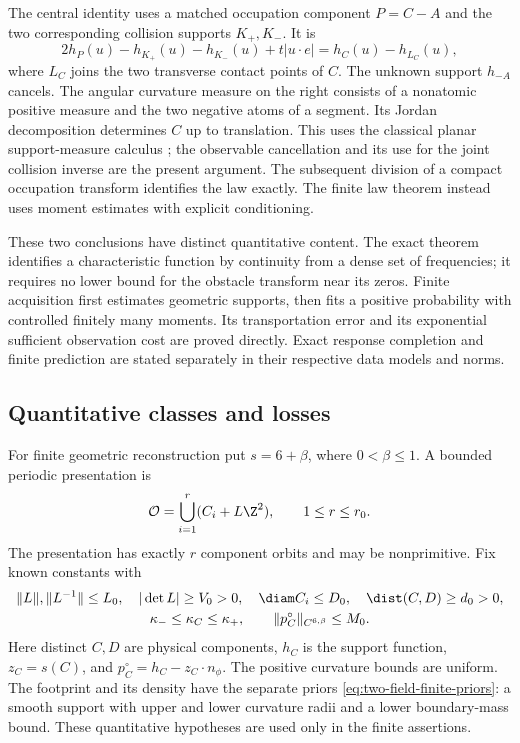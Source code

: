 The central identity uses a matched occupation component $P=C-A$
and the two corresponding collision supports $K_+,K_-$. It is
\[
  2h_P(u)-h_{K_+}(u)-h_{K_-}(u)+t|u\cdot e|=h_C(u)-h_{L_C}(u),
\]
where $L_C$ joins the two transverse contact points of $C$. The
unknown support $h_{-A}$ cancels. The angular curvature measure on
the right consists of a nonatomic positive measure and the two
negative atoms of a segment. Its Jordan decomposition determines
$C$ up to translation. This uses the classical planar support-measure
calculus \cite{Schneider,MartinezMaure}; the observable cancellation
and its use for the joint collision inverse are the present argument.
The subsequent division of a compact occupation transform identifies
the law exactly. The finite law theorem instead uses moment estimates
with explicit conditioning.

These two conclusions have distinct quantitative content. The exact
theorem identifies a characteristic function by continuity from a
dense set of frequencies; it requires no lower bound for the obstacle
transform near its zeros. Finite acquisition first estimates geometric
supports, then fits a positive probability with controlled finitely
many moments. Its transportation error and its exponential sufficient
observation cost are proved directly. Exact response completion and
finite prediction are stated separately in their respective data
models and norms.

\subsection{Quantitative classes and losses}
For finite geometric reconstruction put $s=6+\beta$, where
$0<\beta\le1$. A bounded periodic presentation is
\begin{equation}\label{eq:two-field-presentation}
 \mathcal O=\bigcup_{i=1}^r(C_i+L\Z^2),\qquad 1\le r\le r_0.
\end{equation}
The presentation has exactly $r$ component orbits and may be
nonprimitive. Fix known constants with
\begin{equation}\label{eq:two-field-geometric-priors}
 \begin{gathered}
 \|L\|,\|L^{-1}\|\le L_0,\quad |\det L|\ge V_0>0,\quad
 \diam C_i\le D_0,\quad \dist(C,D)\ge d_0>0,\\
 \kappa_-\le\kappa_C\le\kappa_+,\qquad
                 \|p_C^\circ\|_{C^{6,\beta}}\le M_0.
 \end{gathered}
\end{equation}
Here distinct $C,D$ are physical components, $h_C$ is the support
function, $z_C=s(C)$, and $p_C^\circ=h_C-z_C\cdot n_\phi$.
The positive curvature bounds are uniform. The footprint and its
density have the separate priors
\eqref{eq:two-field-finite-priors}: a smooth support with upper and
lower curvature radii and a lower boundary-mass bound. These
quantitative hypotheses are used only in the finite assertions.

